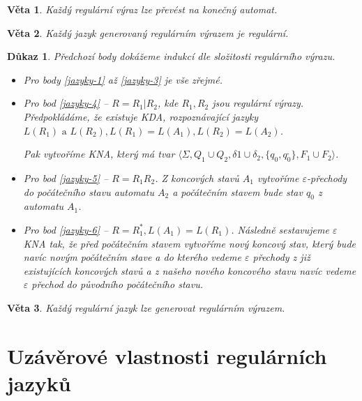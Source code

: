 \documentclass[10pt, a4paper, titlepage]{article}
\theoremstyle{note}
\newtheorem{veta}{Věta}
\newtheorem{dukaz}{Důkaz}
\begin{document}
\begin{veta}
Každý regulární výraz lze převést na konečný automat.
\end{veta}

\begin{veta}
Každý jazyk generovaný regulárním výrazem je regulární.
\end{veta}

\begin{dukaz}
Předchozí body dokážeme indukcí dle složitosti regulárního výrazu.

\begin{itemize}
\item
Pro body \ref{jazyky-1} až \ref{jazyky-3} je vše zřejmé.

\item
Pro bod \ref{jazyky-4} -- $R=R_{1}|R_{2}$, kde $R_{1}, R_{2}$ jsou regulární výrazy. Předpokládáme, že existuje KDA, rozpoznávající
jazyky $L(R_{1}) \text{ a } L(R_{2}), L(R_{1}) = L(A_{1}), L(R_{2}) = L(A_{2})$.

Pak vytvoříme KNA, který má tvar $\langle \Sigma, Q_{1} \cup Q_{2}, \delta{1} \cup \delta_{2}, \lbrace q_{0}, q_{0}^{,} \rbrace, F_{1} \cup F_{2} \rangle$.

\item
Pro bod \ref{jazyky-5}  -- $R=R_{1}R_{2}$. Z koncových stavů $A_{1}$ vytvoříme $\varepsilon$-přechody do počátečního stavu automatu $A_{2}$ a počátečním stavem
bude stav $q_{0}$ z automatu $A_{1}$.

\item
Pro bod \ref{jazyky-6} -- $R=R_{1}^{*}, L(A_{1})=L(R_{1})$. Následně sestavujeme $\varepsilon$ KNA tak, že před počátečním stavem vytvoříme
nový koncový stav, který bude navíc novým počátečním stave a do kterého vedeme $\varepsilon$ přechody z již existujících koncových stavů a z našeho nového koncového stavu navíc vedeme
$\varepsilon$ přechod do původního počátečního stavu.
\end{itemize}
\end{dukaz}

\begin{veta}
Každý regulární jazyk lze generovat regulárním výrazem.
\end{veta}

\section{Uzávěrové vlastnosti regulárních jazyků}
\end{document}
